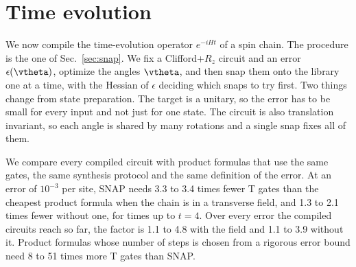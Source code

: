 %

\section{Time evolution}
\label{sec:time_evolution}

We now compile the time-evolution operator $e^{-iHt}$ of a spin chain. The procedure is the one of Sec.~\ref{sec:snap}. We fix a Clifford+$R_z$ circuit and an error $\epsilon(\vtheta)$, optimize the angles $\vtheta$, and then snap them onto the library one at a time, with the Hessian of $\epsilon$ deciding which snaps to try first. Two things change from state preparation. The target is a unitary, so the error has to be small for every input and not just for one state. The circuit is also translation invariant, so each angle is shared by many rotations and a single snap fixes all of them.

We compare every compiled circuit with product formulas that use the same gates, the same synthesis protocol and the same definition of the error. At an error of $10^{-3}$ per site, SNAP needs 3.3 to 3.4 times fewer T gates than the cheapest product formula when the chain is in a transverse field, and 1.3 to 2.1 times fewer without one, for times up to $t = 4$. Over every error the compiled circuits reach so far, the factor is 1.1 to 4.8 with the field and 1.1 to 3.9 without it. Product formulas whose number of steps is chosen from a rigorous error bound need 8 to 51 times more T gates than SNAP.

